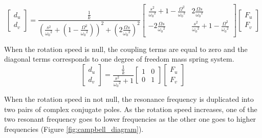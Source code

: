 \documentclass{ISMA_USD2020}
\begin{document}
\begin{equation}
\label{eq:coupled_plant}
\begin{bmatrix} d_u \\ d_v \end{bmatrix} =
\frac{\frac{1}{k}}{\left( \frac{s^2}{{\omega_0}^2} + (1 - \frac{{\Omega}^2}{{\omega_0}^2}) \right)^2 + \left( 2 \frac{{\Omega} s}{{\omega_0}^2} \right)^2}
\begin{bmatrix}
  \frac{s^2}{{\omega_0}^2} + 1 - \frac{{\Omega}^2}{{\omega_0}^2} & 2 \frac{\Omega s}{{\omega_0}^2} \\
  -2 \frac{\Omega s}{{\omega_0}^2}          & \frac{s^2}{{\omega_0}^2} + 1 - \frac{{\Omega}^2}{{\omega_0}^2} \\
\end{bmatrix}
\begin{bmatrix} F_u \\ F_v \end{bmatrix}
\end{equation}

When the rotation speed is null, the coupling terms are equal to zero and the diagonal terms corresponds to one degree of freedom mass spring system.
\begin{equation}
\label{eq:coupled_plant_no_rot}
\begin{bmatrix} d_u \\ d_v \end{bmatrix} =
\frac{\frac{1}{k}}{\frac{s^2}{{\omega_0}^2} + 1}
\begin{bmatrix}
  1 & 0 \\
  0 & 1
\end{bmatrix}
\begin{bmatrix} F_u \\ F_v \end{bmatrix}
\end{equation}

When the rotation speed in not null, the resonance frequency is duplicated into two pairs of complex conjugate poles.
As the rotation speed increases, one of the two resonant frequency goes to lower frequencies as the other one goes to higher frequencies (Figure \ref{fig:campbell_diagram}).
\end{document}
